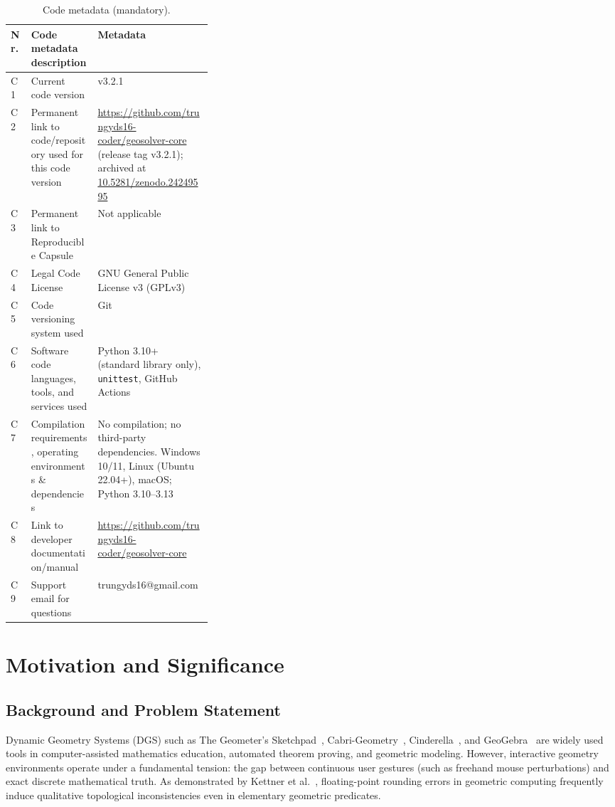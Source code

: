\documentclass[preprint,12pt]{elsarticle}
\begin{document}
\begin{table}[!htbp]
\centering
\caption{Code metadata (mandatory).}
\label{tab:metadata}
\small
\begin{tabularx}{\linewidth}{@{}l>{\raggedright\arraybackslash}p{0.33\linewidth}>{\raggedright\arraybackslash}X@{}}
\toprule
\textbf{Nr.} & \textbf{Code metadata description} & \textbf{Metadata} \\
\midrule
C1 & Current code version & v3.2.1 \\
C2 & Permanent link to code/repository used for this code version & \url{https://github.com/trungyds16-coder/geosolver-core} (release tag v3.2.1); archived at \href{https://doi.org/10.5281/zenodo.24249595}{10.5281/zenodo.24249595} \\
C3 & Permanent link to Reproducible Capsule & Not applicable \\
C4 & Legal Code License & GNU General Public License v3 (GPLv3) \\
C5 & Code versioning system used & Git \\
C6 & Software code languages, tools, and services used & Python 3.10+ (standard library only), \texttt{unittest}, GitHub Actions \\
C7 & Compilation requirements, operating environments \& dependencies & No compilation; no third-party dependencies. Windows 10/11, Linux (Ubuntu 22.04+), macOS; Python 3.10--3.13 \\
C8 & Link to developer documentation/manual & \url{https://github.com/trungyds16-coder/geosolver-core} \\
C9 & Support email for questions & trungyds16@gmail.com \\
\bottomrule
\end{tabularx}
\end{table}

\section{Motivation and Significance}

\subsection{Background and Problem Statement}
Dynamic Geometry Systems (DGS) such as The Geometer's Sketchpad~\cite{jackiw1995}, Cabri-Geometry~\cite{laborde2001}, Cinderella~\cite{cinderella1999}, and GeoGebra~\cite{hohenwarter2007} are widely used tools in computer-assisted mathematics education, automated theorem proving, and geometric modeling. However, interactive geometry environments operate under a fundamental tension: the gap between continuous user gestures (such as freehand mouse perturbations) and exact discrete mathematical truth. As demonstrated by Kettner et al.~\cite{kettner2008}, floating-point rounding errors in geometric computing frequently induce qualitative topological inconsistencies even in elementary geometric predicates.
\end{document}
